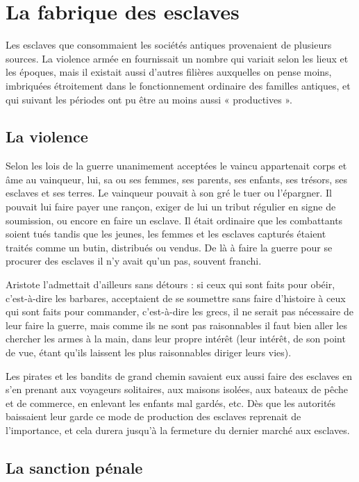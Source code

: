 \section{La fabrique des esclaves}

Les esclaves que consommaient les sociétés antiques provenaient de
plusieurs sources. La violence armée en fournissait un nombre qui variait
selon les lieux et les époques, mais il existait aussi d'autres filières auxquelles
on pense moins, imbriquées étroitement dans le fonctionnement
ordinaire des familles antiques, et qui suivant les périodes ont pu être au
moins aussi « productives ».

\subsection{La violence}

Selon les lois de la guerre unanimement acceptées le vaincu appartenait
corps et âme au vainqueur, lui, sa ou ses femmes, ses parents, ses
enfants, ses trésors, ses esclaves et ses terres. Le vainqueur pouvait à son
gré le tuer ou l'épargner. Il pouvait lui faire payer une rançon, exiger de
lui un tribut régulier en signe de soumission, ou encore en faire un esclave.
Il était ordinaire que les combattants soient tués tandis que les jeunes,
les femmes et les esclaves capturés étaient traités comme un butin, distribués
ou vendus. De là à faire la guerre pour se procurer des esclaves il
n'y avait qu'un pas, souvent franchi.

Aristote l'admettait d'ailleurs sans détours : si ceux qui sont faits
pour obéir, c'est-à-dire les barbares, acceptaient de se soumettre sans faire
d'histoire à ceux qui sont faits pour commander, c'est-à-dire les grecs,
il ne serait pas nécessaire de leur faire la guerre, mais comme ils ne sont
pas raisonnables il faut bien aller les chercher les armes à la main, dans
leur propre intérêt (leur intérêt, de son point de vue, étant qu'ils laissent
les plus raisonnables diriger leurs vies).

Les pirates et les bandits de grand chemin savaient eux aussi faire
des esclaves en s'en prenant aux voyageurs solitaires, aux maisons isolées,
aux bateaux de pêche et de commerce, en enlevant les enfants mal
gardés, etc. Dès que les autorités baissaient leur garde ce mode de production
des esclaves reprenait de l'importance, et cela durera jusqu'à la
fermeture du dernier marché aux esclaves.

\subsection{La sanction pénale}

